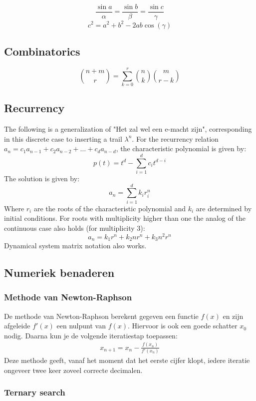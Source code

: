 \documentclass[10pt,hidelinks]{article}
\begin{document}
\[\frac{\sin a}{\alpha} = \frac{\sin b}{\beta} =\frac{\sin c}{\gamma}\]
\[c^2=a^2+b^2-2ab\cos(\gamma)\]

\subsection{Combinatorics}

\[\binom{n+m}{r} = \sum_{k=0}^r \binom{n}{k} \binom{m}{r-k}\]

\subsection{Recurrency}
The following is a generalization of "Het zal wel een e-macht zijn", corresponding in this discrete case to inserting a trail $\lambda^n$.
For the recurrency relation $a_n = c_1a_{n-1} + c_2a_{n-2} + \dots + c_da_{n-d}$, the characteristic polynomial is given by:
\[p(t) = t^d - \sum_{i=1}^d c_it^{d-i}\]
The solution is given by:
\[a_n = \sum_{i=1}^d k_ir_i^n\]
Where $r_i$ are the roots of the characteristic polynomial and $k_i$ are determined by initial conditions. For roots with multiplicity higher than one the analog of the continuous case also holds (for multiplicity 3):
\[a_n = k_1r^n+k_2nr^n+k_3n^2r^n\]
Dynamical system matrix notation also works.

\subsection{Numeriek benaderen}

\subsubsection{Methode van Newton-Raphson}

De methode van Newton-Raphson berekent gegeven een functie $f(x)$ en zijn afgeleide $f'(x)$ een nulpunt van $f(x)$. Hiervoor is ook een goede schatter $x_0$ nodig. Daarna kun je de volgende iteratiestap toepassen:
\begin{align*}
    x_{n+1} = x_{n} - \frac{f(x_{n})}{f'(x_{n})}
\end{align*}
Deze methode geeft, vanaf het moment dat het eerste cijfer klopt, iedere iteratie ongeveer twee keer zoveel correcte decimalen.

\subsubsection{Ternary search}
\end{document}
